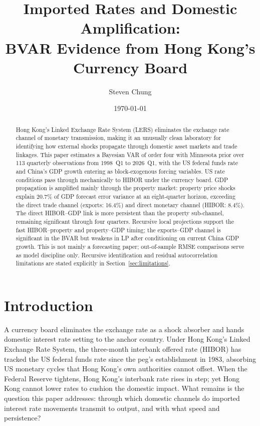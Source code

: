 \documentclass[12pt,a4paper]{article}
\title{Imported Rates and Domestic Amplification:\\
BVAR Evidence from Hong Kong's Currency Board}
\author{Steven Chung}
\date{\today}
\begin{document}
\maketitle

\begin{abstract}
Hong Kong's Linked Exchange Rate System (LERS) eliminates the exchange rate
channel of monetary transmission, making it an unusually clean laboratory for
identifying how external shocks propagate through domestic asset markets and
trade linkages. This paper estimates a Bayesian VAR of order four with Minnesota
prior over 113 quarterly observations from 1998~Q1 to 2026~Q1, with the US
federal funds rate and China's GDP growth entering as block-exogenous forcing
variables. US rate conditions pass through mechanically to HIBOR under the
currency board. GDP propagation is amplified mainly through the property market:
property price shocks explain 20.7\% of GDP forecast error variance at an
eight-quarter horizon, exceeding the direct trade channel (exports: 16.4\%) and
direct monetary channel (HIBOR: 8.4\%). The direct HIBOR--GDP link is
more persistent than the property sub-channel, remaining significant through
four quarters. Recursive local projections support the fast HIBOR--property
and property--GDP timing; the exports--GDP channel is significant in the BVAR
but weakens in LP after conditioning on current China GDP growth. This is not
mainly a forecasting paper; out-of-sample RMSE comparisons serve as model
discipline only. Recursive identification and residual autocorrelation
limitations are stated explicitly in Section~\ref{sec:limitations}.
\end{abstract}

\section{Introduction}
\label{sec:intro}

A currency board eliminates the exchange rate as a shock absorber and hands
domestic interest rate setting to the anchor country. Under Hong Kong's Linked
Exchange Rate System, the three-month interbank offered rate (HIBOR) has tracked
the US federal funds rate since the peg's establishment in 1983, absorbing US
monetary cycles that Hong Kong's own authorities cannot offset. When the Federal
Reserve tightens, Hong Kong's interbank rate rises in step; yet Hong Kong cannot
lower rates to cushion the domestic impact. What remains is the question this
paper addresses: through which domestic channels do imported interest rate
movements transmit to output, and with what speed and persistence?
\end{document}

